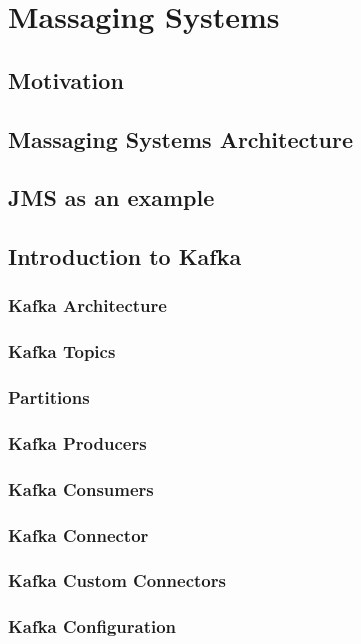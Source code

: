 \section{Massaging Systems}
\subsection{Motivation}
\subsection{Massaging Systems Architecture}
\subsection{JMS as an example}
\subsection{Introduction to Kafka}
\subsubsection{Kafka Architecture}
\subsubsection{Kafka Topics}
\subsubsection{Partitions}
\subsubsection{Kafka Producers}
\subsubsection{Kafka Consumers}
\subsubsection{Kafka Connector}
\subsubsection{Kafka Custom Connectors}
\subsubsection{Kafka Configuration}
